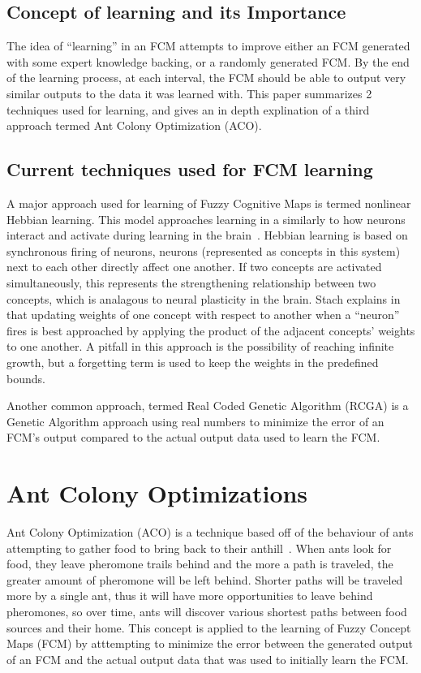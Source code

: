\documentclass{umm-senior-sem}
\begin{document}
\subsection{Concept of learning and its Importance}
The idea of ``learning'' in an FCM attempts to improve either an FCM generated with some expert knowledge backing, or a randomly generated FCM. By the end of the learning process, at each interval, the FCM should be able to output very similar outputs to the data it was learned with. This paper summarizes 2 techniques used for learning, and gives an in depth explination of a third approach termed Ant Colony Optimization (ACO). 

\subsection{Current techniques used for FCM learning}
A major approach used for learning of Fuzzy Cognitive Maps is termed nonlinear Hebbian learning. This model approaches learning in a similarly to how neurons interact and activate during learning in the brain~\cite{response:2003}. Hebbian learning is based on synchronous firing of neurons, neurons (represented as concepts in this system) next to each other directly affect one another. If two concepts are activated simultaneously, this represents the strengthening relationship between two concepts, which is analagous to neural plasticity in the brain. Stach explains in~\cite{nhl:2008} that updating weights of one concept with respect to another when a ``neuron'' fires is best approached by applying the product of the adjacent concepts' weights to one another. A pitfall in this approach is the possibility of reaching infinite growth, but a forgetting term is used to keep the weights in the predefined bounds. 

Another common approach, termed Real Coded Genetic Algorithm (RCGA) is a Genetic Algorithm approach using real numbers to minimize the error of an FCM's output compared to the actual output data used to learn the FCM.

\section{Ant Colony Optimizations}
\label{sec:aco}
Ant Colony Optimization (ACO) is a technique based off of the behaviour of ants attempting to gather food to bring back to their anthill~\cite{main:2012}. When ants look for food, they leave pheromone trails behind and the more a path is traveled, the greater amount of pheromone will be left behind. Shorter paths will be traveled more by a single ant, thus it will have more opportunities to leave behind pheromones, so over time, ants will discover various shortest paths between food sources and their home. This concept is applied to the learning of Fuzzy Concept Maps (FCM) by atttempting to minimize the error between the generated output of an FCM and the actual output data that was used to initially learn the FCM. 
\end{document}
